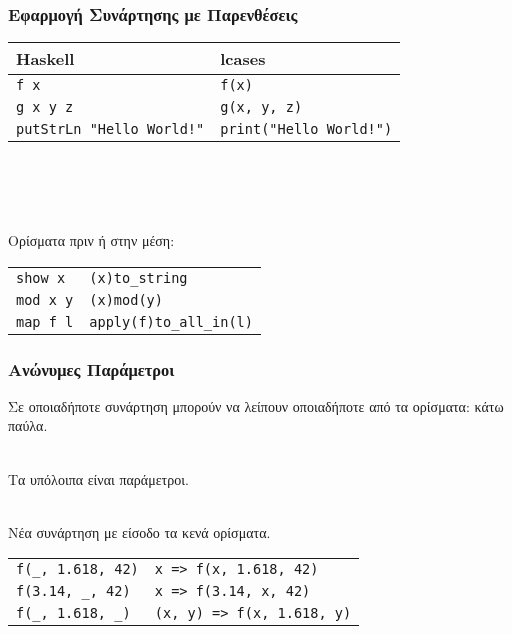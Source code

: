 \documentclass{beamer}
\begin{document}
\begin{frame}[fragile]

\frametitle{Εφαρμογή Συνάρτησης με Παρενθέσεις}

\begin{otherlanguage}{english}

\begin{center}
\begin{tabular}{ |P{5cm}|P{5cm}| }
 \hline
 Haskell & lcases
 \\
 \hline
 \verb|f x| & \verb|f(x)|
 \\
 \verb|g x y z| & \verb|g(x, y, z)|
 \\
 \verb|putStrLn "Hello World!"| & \verb|print("Hello World!")|
 \\
 \hline
\end{tabular}
\\~\
\\~\
\end{center}

\end{otherlanguage}

Ορίσματα πριν ή στην μέση:
\begin{otherlanguage}{english}
\begin{center}
\begin{tabular}{ |P{5cm}|P{5cm}| }
 \hline
 \verb|show x| & \verb|(x)to_string|
 \\
 \verb|mod x y| & \verb|(x)mod(y)|
 \\
 \verb|map f l| & \verb|apply(f)to_all_in(l)|
 \\
 \hline
\end{tabular}
\end{center}
\end{otherlanguage}

\end{frame}

\begin{frame}[fragile]

\frametitle{Ανώνυμες Παράμετροι}

Σε οποιαδήποτε συνάρτηση μπορούν να λείπουν οποιαδήποτε από τα ορίσματα:
κάτω παύλα.
\\~\

Τα υπόλοιπα είναι παράμετροι.
\\~\

Νέα συνάρτηση με είσοδο τα κενά ορίσματα.
\begin{otherlanguage}{english}
\begin{center}
\begin{tabular}{ |P{5cm}|P{5cm}| }
 \hline
 \verb|f(_, 1.618, 42)| & \verb|x => f(x, 1.618, 42)|
 \\
 \verb|f(3.14, _, 42)| & \verb|x => f(3.14, x, 42)|
 \\
 \verb|f(_, 1.618, _)| & \verb|(x, y) => f(x, 1.618, y)|
 \\
 \hline
\end{tabular}
\end{center}
\end{otherlanguage}

\end{frame}
\end{document}

